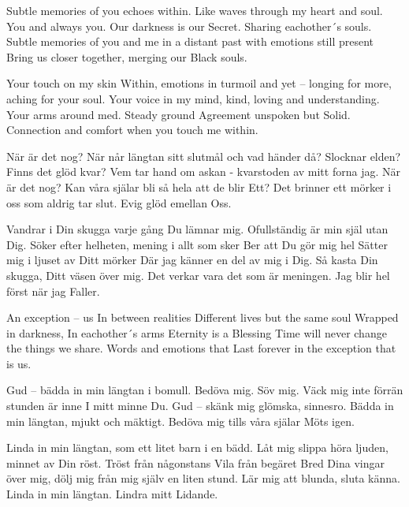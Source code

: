 \startpoem
Subtle memories of you
echoes within.
Like waves through my heart and soul.
You and always you.
Our darkness is our 
Secret.
Sharing eachother´s souls.
Subtle memories of you and me
in a distant past with
emotions still present
Bring us closer together,
merging our
Black souls.
\stoppoem

\startpoem
Your touch on my skin
Within, emotions in turmoil and yet –
longing for more,
aching for your soul.
Your voice in my mind,
kind, loving and understanding.
Your arms around med.
Steady ground
Agreement unspoken but 
Solid.
Connection and comfort 
when you touch me
within.
\stoppoem

\startpoem
När är det nog?
När når längtan sitt slutmål och
vad händer då?
Slocknar elden?
Finns det glöd kvar?
Vem tar hand om askan -
kvarstoden av mitt forna jag.
När är det nog?
Kan våra själar bli så hela att de blir
Ett?
Det brinner ett mörker i oss
som aldrig tar slut.
Evig glöd emellan
Oss.
\stoppoem

\startpoem
Vandrar i Din skugga 
varje gång Du lämnar mig.
Ofullständig är min själ utan Dig.
Söker efter helheten,
mening i allt som sker
Ber att Du gör mig hel
Sätter mig i ljuset av Ditt mörker
Där jag känner en del av mig i Dig.
Så kasta Din skugga,
Ditt väsen över mig.
Det verkar vara det som är meningen.
Jag blir hel först när jag
Faller.
\stoppoem

\startpoem
An exception – us
In between realities
Different lives but the same soul
Wrapped in darkness, 
In eachother´s arms
Eternity is a 
Blessing
Time will never change the things we share.
Words and emotions that
Last forever in the exception 
that is us.
\stoppoem

\startpoem
Gud – bädda in min längtan i bomull.
Bedöva mig.
Söv mig.
Väck mig inte förrän stunden är inne
I mitt minne Du.
Gud – skänk mig glömska, sinnesro.
Bädda in min längtan,
mjukt och mäktigt.
Bedöva mig tills våra själar
Möts igen.
\stoppoem

\startpoem
Linda in min längtan,
som ett litet barn i en bädd.
Låt mig slippa höra ljuden,
minnet av Din röst.
Tröst från någonstans
Vila från begäret
Bred Dina vingar över mig,
dölj mig från mig själv en liten stund.
Lär mig att blunda, sluta känna.
Linda in min längtan.
Lindra mitt 
Lidande.
\stoppoem

